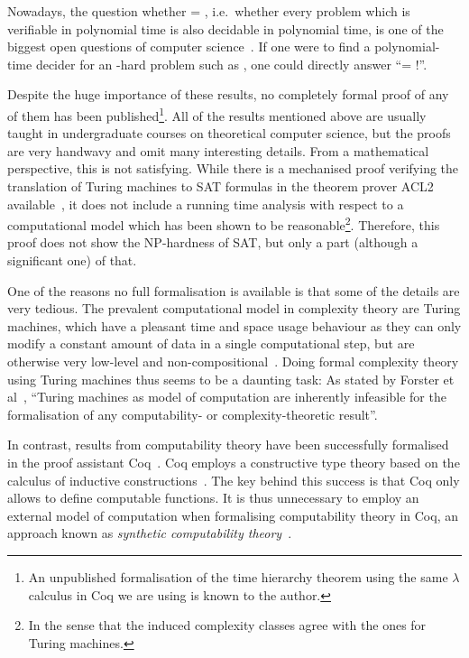 Nowadays, the question whether \PC{} = \NP{}, i.e.\ whether every problem which is verifiable in polynomial time is also decidable in polynomial time, is one of the biggest open questions of computer science~\cite{claymath}. 
If one were to find a polynomial-time decider for an \NP{}-hard problem such as \SAT{}, one could directly answer ``\PC{}= \NP{}!''.

Despite the huge importance of these results, no completely formal proof of any of them has been published\footnote{An unpublished formalisation of the time hierarchy theorem using the same $\lambda$ calculus in Coq we are using is known to the author.}. 
All of the results mentioned above are usually taught in undergraduate courses on theoretical computer science, but the proofs are very handwavy and omit many interesting details. From a mathematical perspective, this is not satisfying.
While there is a mechanised proof verifying the translation of Turing machines to SAT formulas in the theorem prover ACL2 available~\cite{gamboa:cook}, it does not include a running time analysis with respect to a computational model which has been shown to be reasonable\footnote{In the sense that the induced complexity classes agree with the ones for Turing machines.}. Therefore, this proof does not show the NP-hardness of SAT, but only a part (although a significant one) of that.

One of the reasons no full formalisation is available is that some of the details are very tedious. The prevalent computational model in complexity theory are Turing machines, which have a pleasant time and space usage behaviour as they can only modify a constant amount of data in a single computational step, but are otherwise very low-level and non-compositional~\cite{ForsterEtAl:2019:VerifiedTMs}.
Doing formal complexity theory using Turing machines thus seems to be a daunting task: As stated by Forster et al~\cite{ForsterEtAl:2019:VerifiedTMs}, ``Turing machines as model of computation are inherently infeasible for the formalisation of any computability- or complexity-theoretic result''. 

In contrast, results from computability theory have been successfully formalised in the proof assistant Coq~\cite{coqweb}. Coq employs a constructive type theory based on the calculus of inductive constructions~\cite{iclnotes}. The key behind this success is that Coq only allows to define computable functions. It is thus unnecessary to employ an external model of computation when formalising computability theory in Coq, an approach known as \textit{synthetic computability theory}~\cite{ForsterEtAl:2018:On-Synthetic-Undecidability}.

